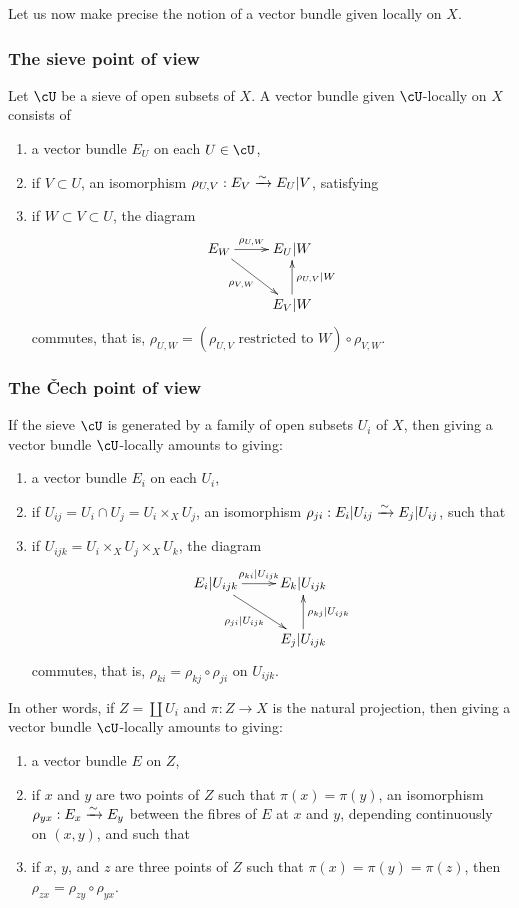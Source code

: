 Let us now make precise the notion of a vector bundle given locally on $X$.

\subsubsection{The sieve point of view}\label{I:1-3-1}

Let $\cU$ be a sieve of open subsets of $X$. A vector bundle given
$\cU$-locally on $X$ consists of
\begin{enumerate}[\indent a)]
  \item a vector bundle $E_U$ on each $U\in \cU$,
  \item if $V\subset U$, an isomorphism
    $\rho_{U,V}:E_V\xrightarrow\sim E_U|V$, satisfying
  \item if $W\subset V\subset U$, the diagram
    \[\xymatrix{
      E_W \ar[r]^-{\rho_{U,W}} \ar[dr]_-{\rho_{V,W}}
        & E_U|W \\
      & E_V|W \ar[u]_-{\rho_{U,V}|W}
    }\]
    commutes, that is,
    $\rho_{U,W} = (\mbox{$\rho_{U,V}$ restricted to $W$}) \circ \rho_{V,W}$.
\end{enumerate}

\subsubsection{The Čech point of view}\label{I:1-3-2}

If the sieve $\cU$ is generated by a family of open subsets $U_i$ of
$X$, then giving a vector bundle $\cU$-locally amounts to giving:
\begin{enumerate}[\indent a)]
  \item a vector bundle $E_i$ on each $U_i$,
  \item if $U_{ij}=U_i\cap U_j=U_i\times_X U_j$, an isomorphism
    $\rho_{ji}:E_i|U_{ij}\xrightarrow\sim E_j|U_{ij}$, such that
  \item if $U_{ijk}=U_i\times_X U_j\times_X U_k$, the diagram
    \[\xymatrix{
      E_i |U_{ijk} \ar[r]^-{\rho_{ki}|U_{ijk}} \ar[dr]_-{\rho_{ji}|U_{ijk}}
        & E_k|U_{ijk} \\
      & E_j|U_{ijk} \ar[u]_-{\rho_{kj}|U_{ijk}}
    }\]
    commutes, that is, $\rho_{ki}=\rho_{kj}\circ\rho_{ji}$ on
    $U_{ijk}$.
\end{enumerate}

In other words, if $Z=\coprod U_i$ and $\pi:Z\to X$ is the natural
projection, then giving a vector bundle $\cU$-locally amounts to giving:
\begin{enumerate}[\indent a)]
  \item a vector bundle $E$ on $Z$,
  \item if $x$ and $y$ are two points of $Z$ such that
    $\pi(x)=\pi(y)$, an isomorphism $\rho_{yx}:E_x\xrightarrow\sim E_y$ between the
    fibres of $E$ at $x$ and $y$, depending continuously on $(x,y)$,
    and such that
  \item if $x$, $y$, and $z$ are three points of $Z$ such that
    $\pi(x)=\pi(y)=\pi(z)$, then
    $\rho_{zx}=\rho_{zy}\circ\rho_{yx}$.
\end{enumerate}

